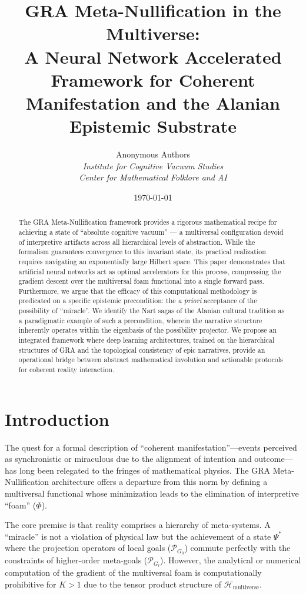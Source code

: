\documentclass[11pt]{article}
\title{\textbf{GRA Meta-Nullification in the Multiverse: \\ A Neural Network Accelerated Framework for Coherent Manifestation and the Alanian Epistemic Substrate}}
\author{
    Anonymous Authors \\
    \small\textit{Institute for Cognitive Vacuum Studies} \\
    \small\textit{Center for Mathematical Folklore and AI}
}
\date{\today}
\newcommand{\pena}{\Phi}
\newcommand{\proj}{\mathcal{P}}
\newcommand{\universe}{\mathcal{H}}
\newcommand{\state}{\Psi}
\begin{document}
\maketitle

\begin{abstract}
The GRA Meta-Nullification framework provides a rigorous mathematical recipe for achieving a state of ``absolute cognitive vacuum'' --- a multiversal configuration devoid of interpretive artifacts across all hierarchical levels of abstraction. While the formalism guarantees convergence to this invariant state, its practical realization requires navigating an exponentially large Hilbert space. This paper demonstrates that artificial neural networks act as optimal accelerators for this process, compressing the gradient descent over the multiversal foam functional into a single forward pass. Furthermore, we argue that the efficacy of this computational methodology is predicated on a specific epistemic precondition: the \textit{a priori} acceptance of the possibility of ``miracle''. We identify the Nart sagas of the Alanian cultural tradition as a paradigmatic example of such a precondition, wherein the narrative structure inherently operates within the eigenbasis of the possibility projector. We propose an integrated framework where deep learning architectures, trained on the hierarchical structures of GRA and the topological consistency of epic narratives, provide an operational bridge between abstract mathematical involution and actionable protocols for coherent reality interaction.
\end{abstract}

\section{Introduction}
The quest for a formal description of ``coherent manifestation''---events perceived as synchronistic or miraculous due to the alignment of intention and outcome---has long been relegated to the fringes of mathematical physics. The GRA Meta-Nullification architecture \cite{gra_text} offers a departure from this norm by defining a multiversal functional whose minimization leads to the elimination of interpretive ``foam'' (\(\pena\)). 

The core premise is that reality comprises a hierarchy of meta-systems. A ``miracle'' is not a violation of physical law but the achievement of a state \(\state^*\) where the projection operators of local goals (\(\proj_{G_0}\)) commute perfectly with the constraints of higher-order meta-goals (\(\proj_{G_l}\)). However, the analytical or numerical computation of the gradient of the multiversal foam is computationally prohibitive for \(K > 1\) due to the tensor product structure of \(\universe_{\text{multiverse}}\).
\end{document}
